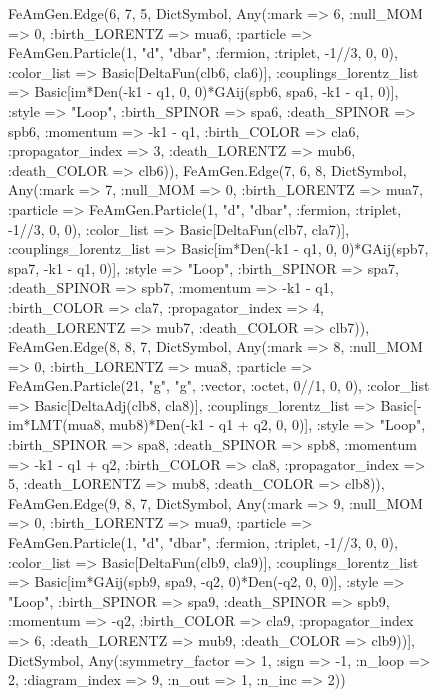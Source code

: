 \documentclass{revtex4}
\begin{document}
\begin{figure}[!htb]
\begin{center}
{FeAmGen.Edge(6, 7, 5, Dict{Symbol, Any}(:mark => 6, :null_MOM => 0, :birth_LORENTZ => mua6, :particle => FeAmGen.Particle(1, "d", "dbar", :fermion, :triplet, -1//3, 0, 0), :color_list => Basic[DeltaFun(clb6, cla6)], :couplings_lorentz_list => Basic[im*Den(-k1 - q1, 0, 0)*GAij(spb6, spa6, -k1 - q1, 0)], :style => "Loop", :birth_SPINOR => spa6, :death_SPINOR => spb6, :momentum => -k1 - q1, :birth_COLOR => cla6, :propagator_index => 3, :death_LORENTZ => mub6, :death_COLOR => clb6)), FeAmGen.Edge(7, 6, 8, Dict{Symbol, Any}(:mark => 7, :null_MOM => 0, :birth_LORENTZ => mua7, :particle => FeAmGen.Particle(1, "d", "dbar", :fermion, :triplet, -1//3, 0, 0), :color_list => Basic[DeltaFun(clb7, cla7)], :couplings_lorentz_list => Basic[im*Den(-k1 - q1, 0, 0)*GAij(spb7, spa7, -k1 - q1, 0)], :style => "Loop", :birth_SPINOR => spa7, :death_SPINOR => spb7, :momentum => -k1 - q1, :birth_COLOR => cla7, :propagator_index => 4, :death_LORENTZ => mub7, :death_COLOR => clb7)), FeAmGen.Edge(8, 8, 7, Dict{Symbol, Any}(:mark => 8, :null_MOM => 0, :birth_LORENTZ => mua8, :particle => FeAmGen.Particle(21, "g", "g", :vector, :octet, 0//1, 0, 0), :color_list => Basic[DeltaAdj(clb8, cla8)], :couplings_lorentz_list => Basic[-im*LMT(mua8, mub8)*Den(-k1 - q1 + q2, 0, 0)], :style => "Loop", :birth_SPINOR => spa8, :death_SPINOR => spb8, :momentum => -k1 - q1 + q2, :birth_COLOR => cla8, :propagator_index => 5, :death_LORENTZ => mub8, :death_COLOR => clb8)), FeAmGen.Edge(9, 8, 7, Dict{Symbol, Any}(:mark => 9, :null_MOM => 0, :birth_LORENTZ => mua9, :particle => FeAmGen.Particle(1, "d", "dbar", :fermion, :triplet, -1//3, 0, 0), :color_list => Basic[DeltaFun(clb9, cla9)], :couplings_lorentz_list => Basic[im*GAij(spb9, spa9, -q2, 0)*Den(-q2, 0, 0)], :style => "Loop", :birth_SPINOR => spa9, :death_SPINOR => spb9, :momentum => -q2, :birth_COLOR => cla9, :propagator_index => 6, :death_LORENTZ => mub9, :death_COLOR => clb9))], Dict{Symbol, Any}(:symmetry_factor => 1, :sign => -1, :n_loop => 2, :diagram_index => 9, :n_out => 1, :n_inc => 2)) 
}
\end{center}
\end{figure}
\end{document}
